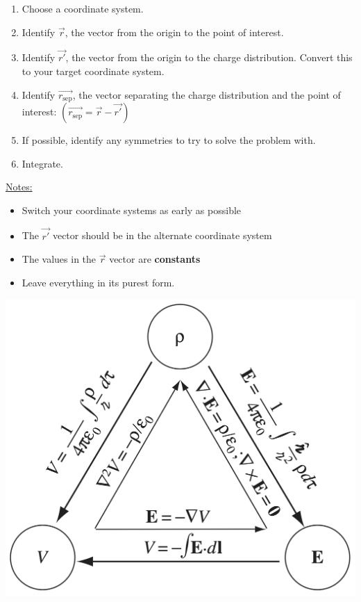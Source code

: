 \documentclass{article}
\newcommand{\sepvec}{\vec{r_\textrm{sep}}}
\newcommand{\formbox}[2]{\begin{center} \begin{tcolorbox}[title = #1, boxrule=2pt,arc=3.4pt,boxsep=0mm] #2\end{tcolorbox}\end{center}}
\begin{document}
\begin{multicols*}{3}
\formbox{Problem Solving Stragegy -- Coulomb Integrals}{
    \begin{enumerate}
        \item Choose a coordinate system.
        \item Identify $\vec{r}$, the vector from the origin to the point of interest.
        \item Identify $\vec{r'}$, the vector from the origin to the charge distribution. Convert this to your target coordinate system.
        \item Identify $\sepvec$, the vector separating the charge distribution and the point of interest:
        $(\sepvec = \vec{r} - \vec{r'})$
        \item If possible, identify any symmetries to try to solve the problem with.
        \item Integrate.
    \end{enumerate}
    \underline{Notes:}
    \begin{itemize}
        \item Switch your coordinate systems as early as possible
        \item The $\vec{r'}$ vector should be in the alternate coordinate system
        \item The values in the $\vec{r}$ vector are \textbf{constants}
        \item Leave everything in its purest form.
    \end{itemize}
}

\formbox{The Electricity and Magnetism Triangle}{
    \begin{center}
        \includegraphics[scale=0.145]{em-triangle}
    \end{center}
}


\end{multicols*}
\end{document}
